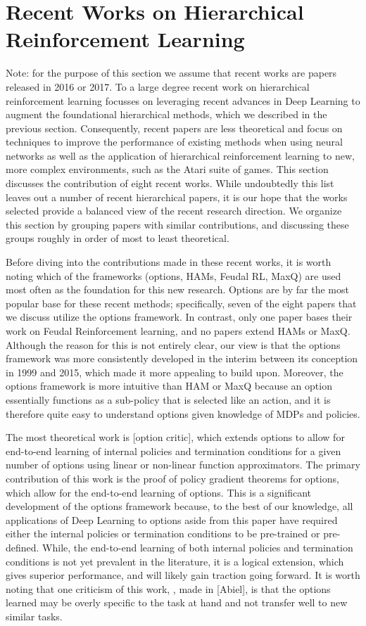 \section{Recent Works on Hierarchical Reinforcement Learning}
Note: for the purpose of this section we assume that recent works are papers released in 2016 or 2017.
To a large degree recent work on hierarchical reinforcement learning focusses on leveraging recent advances in
Deep Learning to augment the foundational hierarchical methods, which we described in the previous section.
Consequently, recent papers are less theoretical and focus on techniques to improve the performance
of existing methods when using neural networks as well as the application of hierarchical reinforcement learning
to new, more complex environments, such as the Atari suite of games.
This section discusses the contribution of eight recent works. While undoubtedly this list leaves out a number
of recent hierarchical papers, it is our hope that the works selected provide a balanced view of the recent
research direction. We organize this section by grouping papers with similar contributions, and discussing
these groups roughly in order of most to least theoretical.

Before diving into the contributions made in these recent works, it is worth noting which of the frameworks
(options, HAMs, Feudal RL, MaxQ) are used most often as the foundation for this new research.
Options are by far the most popular base for these recent methods; specifically, seven of the eight
papers that we discuss utilize the options framework. In contrast, only one paper bases their work
on Feudal Reinforcement learning, and no papers extend HAMs or MaxQ. Although the reason for this is
not entirely clear, our view is that the options framework was more consistently developed in the interim
between its conception in 1999 and 2015, which made it more appealing to build upon. Moreover, the options
framework is more intuitive than HAM or MaxQ because an option essentially functions as a sub-policy that is
selected like an action, and it is therefore quite easy to understand options given knowledge of MDPs and policies.

The most theoretical work is [option critic], which extends options to allow for end-to-end learning
of internal policies and termination conditions for a given number of options using
linear or non-linear function approximators. The primary contribution of this work is the proof
of policy gradient theorems for options, which allow for the end-to-end learning of options.
This is a significant development of the options framework because, to the best of our knowledge,
all applications of Deep Learning to options aside from this paper have required either the internal policies
or termination conditions to be pre-trained or pre-defined. While, the end-to-end learning of both internal policies
and termination conditions is not yet prevalent in the literature, it is a logical extension, which gives superior
performance, and will likely gain traction going forward. It is worth noting that one criticism of this work,
, made in [Abiel], is that the options learned may be overly specific to the task at hand and not transfer well
to new similar tasks.

